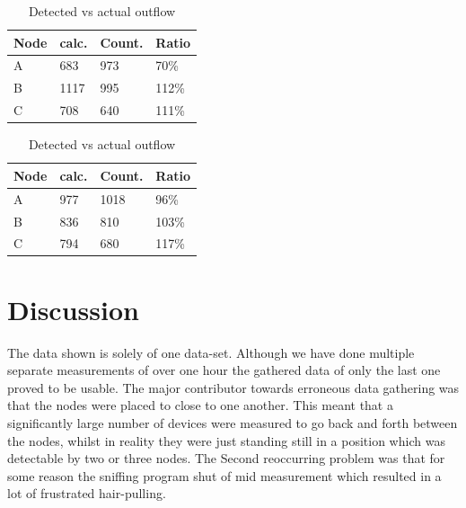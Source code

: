 \documentclass{IEEEtran}
\begin{document}
\begin{table}
    \begin{minipage}{.5\linewidth}
 
        \centering   
        \caption{Detected vs actual inflow}
        \label{tab:inflowresult}
        \begin{tabular}{|l|l|l|l|}
        \hline
        Node & calc.      & Count.  & Ratio \\ \hline
        A    & 683        & 973     & 70\%  \\ \hline
        B    & 1117       & 995     & 112\% \\ \hline
        C    & 708        & 640     & 111\% \\ \hline
        \end{tabular}

    \end{minipage}%
    \begin{minipage}{.5\linewidth}
    
        \centering   
        \caption{Detected vs actual outflow}
        \label{tab:outflowresult}
        \begin{tabular}{|l|l|l|l|}
        \hline
        Node & calc.      & Count. & Ratio  \\ \hline
        A    & 977        & 1018    & 96\%  \\ \hline
        B    & 836        & 810     & 103\% \\ \hline
        C    & 794        & 680     & 117\% \\ \hline
        \end{tabular}

    \end{minipage} 
\end{table}



\section{Discussion}
The data shown is solely of one data-set. Although we have done multiple separate measurements of over one hour the gathered data of only the last one proved to be usable. The major contributor towards erroneous data gathering was that the nodes were placed to close to one another. This meant that a significantly large number of devices were measured to go back and forth between the nodes, whilst in reality they were just standing still in a position which was detectable by two or three nodes. The Second reoccurring problem was that for some reason the sniffing program shut of mid measurement which resulted in a lot of frustrated hair-pulling.
\end{document}
